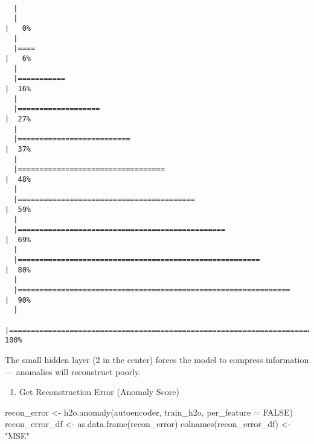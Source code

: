 \documentclass[
  11pt,
  letterpaper,
  DIV=11,
  numbers=noendperiod]{scrartcl}
\newenvironment{Shaded}{}{}
\newcommand{\AttributeTok}[1]{\textcolor[rgb]{0.84,0.23,0.29}{#1}}
\newcommand{\ConstantTok}[1]{\textcolor[rgb]{0.00,0.36,0.77}{#1}}
\newcommand{\FunctionTok}[1]{\textcolor[rgb]{0.44,0.26,0.76}{#1}}
\newcommand{\NormalTok}[1]{\textcolor[rgb]{0.14,0.16,0.18}{#1}}
\newcommand{\OtherTok}[1]{\textcolor[rgb]{0.44,0.26,0.76}{#1}}
\newcommand{\StringTok}[1]{\textcolor[rgb]{0.01,0.18,0.38}{#1}}
\providecommand{\tightlist}{%
  \setlength{\itemsep}{0pt}\setlength{\parskip}{0pt}}\usepackage{longtable,booktabs,array}
\begin{document}
\begin{verbatim}

  |                                                                            
  |                                                                      |   0%
  |                                                                            
  |====                                                                  |   6%
  |                                                                            
  |===========                                                           |  16%
  |                                                                            
  |===================                                                   |  27%
  |                                                                            
  |==========================                                            |  37%
  |                                                                            
  |==================================                                    |  48%
  |                                                                            
  |=========================================                             |  59%
  |                                                                            
  |================================================                      |  69%
  |                                                                            
  |========================================================              |  80%
  |                                                                            
  |===============================================================       |  90%
  |                                                                            
  |======================================================================| 100%
\end{verbatim}

The small hidden layer (2 in the center) forces the model to compress
information --- anomalies will reconstruct poorly.

\begin{enumerate}
\def\labelenumi{\arabic{enumi}.}
\setcounter{enumi}{2}
\tightlist
\item
  Get Reconstruction Error (Anomaly Score)
\end{enumerate}

\begin{Shaded}
\begin{Highlighting}[]
\NormalTok{recon\_error }\OtherTok{\textless{}{-}} \FunctionTok{h2o.anomaly}\NormalTok{(autoencoder, train\_h2o, }\AttributeTok{per\_feature =} \ConstantTok{FALSE}\NormalTok{)}
\NormalTok{recon\_error\_df }\OtherTok{\textless{}{-}} \FunctionTok{as.data.frame}\NormalTok{(recon\_error)}
\FunctionTok{colnames}\NormalTok{(recon\_error\_df) }\OtherTok{\textless{}{-}} \StringTok{"MSE"}
\end{Highlighting}
\end{Shaded}
\end{document}
